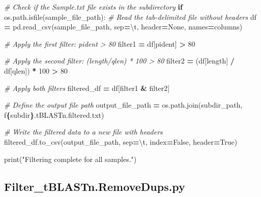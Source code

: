 \documentclass[
]{book}
\newenvironment{Shaded}{\begin{snugshade}}{\end{snugshade}}
\newcommand{\BuiltInTok}[1]{#1}
\newcommand{\CharTok}[1]{\textcolor[rgb]{0.31,0.60,0.02}{#1}}
\newcommand{\CommentTok}[1]{\textcolor[rgb]{0.56,0.35,0.01}{\textit{#1}}}
\newcommand{\ControlFlowTok}[1]{\textcolor[rgb]{0.13,0.29,0.53}{\textbf{#1}}}
\newcommand{\DecValTok}[1]{\textcolor[rgb]{0.00,0.00,0.81}{#1}}
\newcommand{\NormalTok}[1]{#1}
\newcommand{\OperatorTok}[1]{\textcolor[rgb]{0.81,0.36,0.00}{\textbf{#1}}}
\newcommand{\SpecialCharTok}[1]{\textcolor[rgb]{0.81,0.36,0.00}{\textbf{#1}}}
\newcommand{\SpecialStringTok}[1]{\textcolor[rgb]{0.31,0.60,0.02}{#1}}
\newcommand{\StringTok}[1]{\textcolor[rgb]{0.31,0.60,0.02}{#1}}
\newcommand{\VariableTok}[1]{\textcolor[rgb]{0.00,0.00,0.00}{#1}}
\begin{document}
\begin{Shaded}
\begin{Highlighting}[]
        \CommentTok{\# Check if the Sample.txt file exists in the subdirectory}
        \ControlFlowTok{if}\NormalTok{ os.path.isfile(sample\_file\_path):}
            \CommentTok{\# Read the tab{-}delimited file without headers}
\NormalTok{            df }\OperatorTok{=}\NormalTok{ pd.read\_csv(sample\_file\_path, sep}\OperatorTok{=}\StringTok{\textquotesingle{}}\CharTok{\textbackslash{}t}\StringTok{\textquotesingle{}}\NormalTok{, header}\OperatorTok{=}\VariableTok{None}\NormalTok{, names}\OperatorTok{=}\NormalTok{columns)}
            
            \CommentTok{\# Apply the first filter: pident \textgreater{} 80}
\NormalTok{            filter1 }\OperatorTok{=}\NormalTok{ df[}\StringTok{\textquotesingle{}pident\textquotesingle{}}\NormalTok{] }\OperatorTok{\textgreater{}} \DecValTok{80}
            
            \CommentTok{\# Apply the second filter: (length/qlen) * 100 \textgreater{} 80}
\NormalTok{            filter2 }\OperatorTok{=}\NormalTok{ (df[}\StringTok{\textquotesingle{}length\textquotesingle{}}\NormalTok{] }\OperatorTok{/}\NormalTok{ df[}\StringTok{\textquotesingle{}qlen\textquotesingle{}}\NormalTok{]) }\OperatorTok{*} \DecValTok{100} \OperatorTok{\textgreater{}} \DecValTok{80}
            
            \CommentTok{\# Apply both filters}
\NormalTok{            filtered\_df }\OperatorTok{=}\NormalTok{ df[filter1 }\OperatorTok{\&}\NormalTok{ filter2]}
            
            \CommentTok{\# Define the output file path}
\NormalTok{            output\_file\_path }\OperatorTok{=}\NormalTok{ os.path.join(subdir\_path, }\SpecialStringTok{f\textquotesingle{}}\SpecialCharTok{\{}\NormalTok{subdir}\SpecialCharTok{\}}\SpecialStringTok{.tBLASTn.filtered.txt\textquotesingle{}}\NormalTok{)}
            
            \CommentTok{\# Write the filtered data to a new file with headers}
\NormalTok{            filtered\_df.to\_csv(output\_file\_path, sep}\OperatorTok{=}\StringTok{\textquotesingle{}}\CharTok{\textbackslash{}t}\StringTok{\textquotesingle{}}\NormalTok{, index}\OperatorTok{=}\VariableTok{False}\NormalTok{, header}\OperatorTok{=}\VariableTok{True}\NormalTok{)}

\BuiltInTok{print}\NormalTok{(}\StringTok{"Filtering complete for all samples."}\NormalTok{)}
\end{Highlighting}
\end{Shaded}

\subsection{Filter\_tBLASTn.RemoveDups.py}\label{reduptblastn-script}
\end{document}
